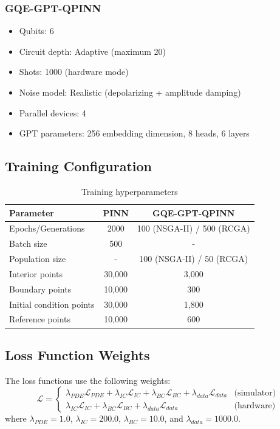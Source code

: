 \documentclass[11pt,a4paper,uplatex,dvipdfmx]{jsarticle}
\begin{document}
\subsubsection{GQE-GPT-QPINN}
\begin{itemize}
    \item Qubits: 6
    \item Circuit depth: Adaptive (maximum 20)
    \item Shots: 1000 (hardware mode)
    \item Noise model: Realistic (depolarizing + amplitude damping)
    \item Parallel devices: 4
    \item GPT parameters: 256 embedding dimension, 8 heads, 6 layers
\end{itemize}

\subsection{Training Configuration}

\begin{table}[h]
\centering
\caption{Training hyperparameters}
\begin{tabular}{lcc}
\toprule
Parameter & PINN & GQE-GPT-QPINN \\
\midrule
Epochs/Generations & 2000 & 100 (NSGA-II) / 500 (RCGA) \\
Batch size & 500 & - \\
Population size & - & 100 (NSGA-II) / 50 (RCGA) \\
Interior points & 30,000 & 3,000 \\
Boundary points & 10,000 & 300 \\
Initial condition points & 30,000 & 1,800 \\
Reference points & 10,000 & 600 \\
\bottomrule
\end{tabular}
\end{table}

\subsection{Loss Function Weights}

The loss functions use the following weights:
\begin{equation}
    \mathcal{L} = \begin{cases}
        \lambda_{PDE} \mathcal{L}_{PDE} + \lambda_{IC} \mathcal{L}_{IC} + \lambda_{BC} \mathcal{L}_{BC} + \lambda_{data} \mathcal{L}_{data} & \text{(simulator)} \\
        \lambda_{IC} \mathcal{L}_{IC} + \lambda_{BC} \mathcal{L}_{BC} + \lambda_{data} \mathcal{L}_{data} & \text{(hardware)}
    \end{cases}
\end{equation}
where $\lambda_{PDE} = 1.0$, $\lambda_{IC} = 200.0$, $\lambda_{BC} = 10.0$, and $\lambda_{data} = 1000.0$.
\end{document}
